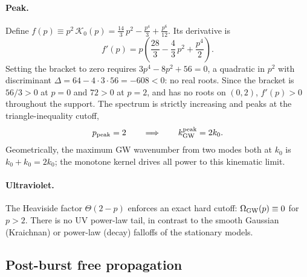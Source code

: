 \documentclass[10pt,prd,aps,nobibnotes,superscriptaddress,preprintnumbers,notitlepage]{revtex4-1}
\begin{document}
\paragraph{Peak.}
Define $f(p)\equiv p^2\,\mathcal{K}_0(p)=\tfrac{14}{3}\,p^2-\tfrac{p^4}{3}+\tfrac{p^6}{12}$.
Its derivative is
\begin{equation}
  f'(p) = p\!\left(\frac{28}{3} - \frac{4}{3}\,p^2 + \frac{p^4}{2}\right).
\end{equation}
Setting the bracket to zero requires $3p^4-8p^2+56=0$, a quadratic in $p^2$
with discriminant $\Delta=64-4\cdot3\cdot56=-608<0$: no real roots. Since the
bracket is $56/3>0$ at $p=0$ and $72>0$ at $p=2$, and has no roots on $(0,2)$,
$f'(p)>0$ throughout the support. The spectrum is strictly increasing and peaks
at the triangle-inequality cutoff,
\begin{equation}
  p_{\rm peak} = 2 \qquad\Longrightarrow\qquad k_{\rm GW}^{\rm peak} = 2k_0.
  \label{eq:impulsive-peak}
\end{equation}
Geometrically, the maximum GW wavenumber from two modes both at $k_0$ is
$k_0+k_0=2k_0$; the monotone kernel drives all power to this kinematic limit.

\paragraph{Ultraviolet.}
The Heaviside factor $\Theta(2-p)$ enforces an exact hard cutoff: $\Omega_{\rm
GW}(p)\equiv0$ for $p>2$. There is no UV power-law tail, in contrast to the
smooth Gaussian (Kraichnan) or power-law (decay) falloffs of the stationary
models.

\subsection{Post-burst free propagation}
\label{sec:impulsive-propagation}
\end{document}
